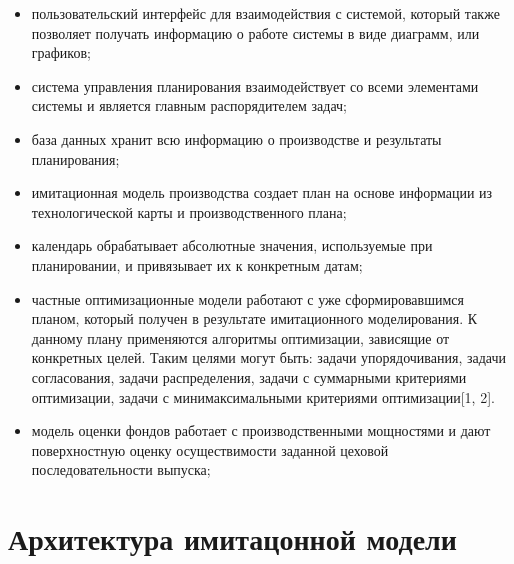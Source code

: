 \begin{itemize}
    \item пользовательский интерфейс для взаимодействия с системой, который также позволяет получать информацию о работе системы в виде диаграмм, или графиков; 
    \item система управления планирования взаимодействует со всеми элементами системы и является главным распорядителем задач;
    \item база данных хранит всю информацию о производстве и результаты планирования; 
    \item имитационная модель производства создает план на основе информации из технологической карты и производственного плана;
    \item календарь обрабатывает абсолютные значения, используемые при планировании, и привязывает их к конкретным датам;
    \item частные оптимизационные модели работают с уже сформировавшимся планом, который получен в результате имитационного моделирования. К данному плану применяются алгоритмы оптимизации, зависящие от конкретных целей. Таким целями могут быть: задачи упорядочивания, задачи согласования, задачи распределения, задачи с суммарными критериями оптимизации, задачи с минимаксимальными критериями оптимизации[1, 2].
    \item модель оценки фондов работает с производственными мощностями и дают поверхностную оценку осуществимости заданной цеховой последовательности выпуска;
\end{itemize}

\section{Архитектура имитацонной модели}


